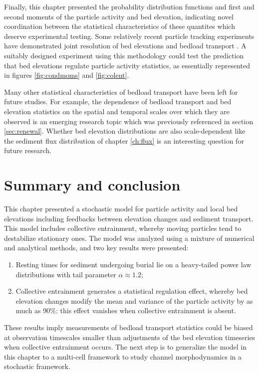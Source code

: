 Finally, this chapter presented the probability distribution functions and first and second moments of the particle activity and bed elevation, indicating novel coordination between the statistical characteristics of these quantites which deserve experimental testing.
Some relatively recent particle tracking experiments have demonstrated joint resolution of bed elevations and bedload transport \citep{Martin2014,Heyman2016}.
A suitably designed experiment using this methodology could test the prediction that bed elevations regulate particle activity statistics, as essentially represented in figures \ref{fig:condmoms} and \ref{fig:colent}. 

Many other statistical characteristics of bedload transport have been left for future studies. 
For example, the dependence of bedload transport \citep{Saletti2015,Singh2009} and bed elevation statistics \citep{Aberle2006, Singh2009,Singh2012} on the spatial and temporal scales over which they are observed is an emerging research topic which was previously referenced in section \ref{sec:renewal}.
Whether bed elevation distributions are also scale-dependent like the sediment flux distribution of chapter \ref{ch:flux} is an interesting question for future research.

\section{Summary and conclusion}
\label{sec:eleconclusion}

This chapter presented a stochastic model for particle activity and local bed elevations including feedbacks between elevation changes and sediment transport.
This model includes collective entrainment, whereby moving particles tend to destabilize stationary ones.
The model was analyzed using a mixture of numerical and analytical methods, and two key results were presented:
\begin{enumerate}
	\item Resting times for sediment undergoing burial lie on a heavy-tailed power law distributions with tail parameter $\alpha \approx 1.2$;
	\item Collective entrainment generates a statistical regulation effect, whereby bed elevation changes modify the mean and variance of the particle activity by as much as 90\%: this effect vanishes when collective entrainment is absent.
\end{enumerate}
These results imply measurements of bedload transport statistics could be biased at observation timescales smaller than adjustments of the bed elevation timeseries when collective entrainment occurs.
The next step is to generalize the model in this chapter to a multi-cell framework to study channel morphodynamics in a stochastic framework.
